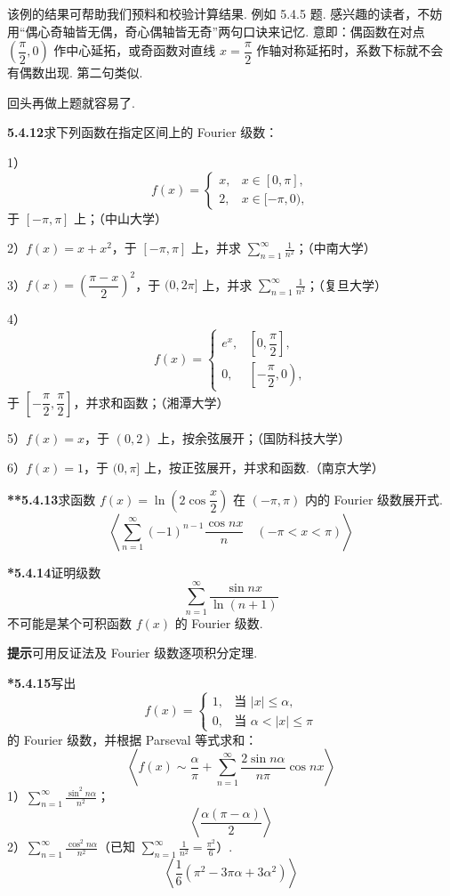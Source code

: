 \documentclass[UTF8, 12pt, fontset=fandol, oneside]{ctexart}
\begin{document}
该例的结果可帮助我们预料和校验计算结果. 例如 5.4.5 题.
感兴趣的读者，不妨用“偶心奇轴皆无偶，奇心偶轴皆无奇”两句口诀来记忆. 意即：偶函数在对点
$\left(\dfrac{\pi}{2},0\right)$ 作中心延拓，或奇函数对直线 $x=\dfrac{\pi}{2}$ 作轴对称延拓时，系数下标就不会有偶数出现. 第二句类似.

回头再做上题就容易了.

\noindent\textbf{5.4.12}\quad 求下列函数在指定区间上的 Fourier 级数：

1）
\[
  f(x)=
  \begin{cases}
  x,&x\in[0,\pi],\\
  2,&x\in[-\pi,0),
  \end{cases}
\]
于 $[-\pi,\pi]$ 上；（中山大学）

2）$f(x)=x+x^2$，于 $[-\pi,\pi]$ 上，并求
$\displaystyle\sum_{n=1}^{\infty}\frac1{n^2}$；（中南大学）

3）$f(x)=\left(\dfrac{\pi-x}{2}\right)^2$，于 $(0,2\pi]$ 上，并求
$\displaystyle\sum_{n=1}^{\infty}\frac1{n^2}$；（复旦大学）

4）
\[
  f(x)=
  \begin{cases}
  e^x,&\left[0,\dfrac{\pi}{2}\right],\\
  0,&\left[-\dfrac{\pi}{2},0\right),
  \end{cases}
\]
于 $\left[-\dfrac{\pi}{2},\dfrac{\pi}{2}\right]$，并求和函数；（湘潭大学）

5）$f(x)=x$，于 $(0,2)$ 上，按余弦展开；（国防科技大学）

6）$f(x)=1$，于 $(0,\pi]$ 上，按正弦展开，并求和函数.（南京大学）

\noindent\textbf{**5.4.13}\quad 求函数
$f(x)=\ln\left(2\cos\dfrac{x}{2}\right)$ 在 $(-\pi,\pi)$ 内的 Fourier 级数展开式.
\[
  \left\langle \sum_{n=1}^{\infty}(-1)^{n-1}\frac{\cos nx}{n}\quad(-\pi<x<\pi)\right\rangle
\]

\noindent\textbf{*5.4.14}\quad 证明级数
\[
  \sum_{n=1}^{\infty}\frac{\sin nx}{\ln(n+1)}
\]
不可能是某个可积函数 $f(x)$ 的 Fourier 级数.

\noindent\textbf{提示}\quad 可用反证法及 Fourier 级数逐项积分定理.

\noindent\textbf{*5.4.15}\quad 写出
\[
  f(x)=
  \begin{cases}
  1,&\text{当 }|x|\le\alpha,\\
  0,&\text{当 }\alpha<|x|\le\pi
  \end{cases}
\]
的 Fourier 级数，并根据 Parseval 等式求和：
\[
  \left\langle f(x)\sim\frac{\alpha}{\pi}+
  \sum_{n=1}^{\infty}\frac{2\sin n\alpha}{n\pi}\cos nx\right\rangle
\]
1）$\displaystyle\sum_{n=1}^{\infty}\frac{\sin^2n\alpha}{n^2}$；
\[
  \left\langle\frac{\alpha(\pi-\alpha)}{2}\right\rangle
\]
2）$\displaystyle\sum_{n=1}^{\infty}\frac{\cos^2n\alpha}{n^2}$（已知 $\displaystyle\sum_{n=1}^{\infty}\frac1{n^2}=\frac{\pi^2}{6}$）.
\[
  \left\langle\frac16(\pi^2-3\pi\alpha+3\alpha^2)\right\rangle
\]
\end{document}
